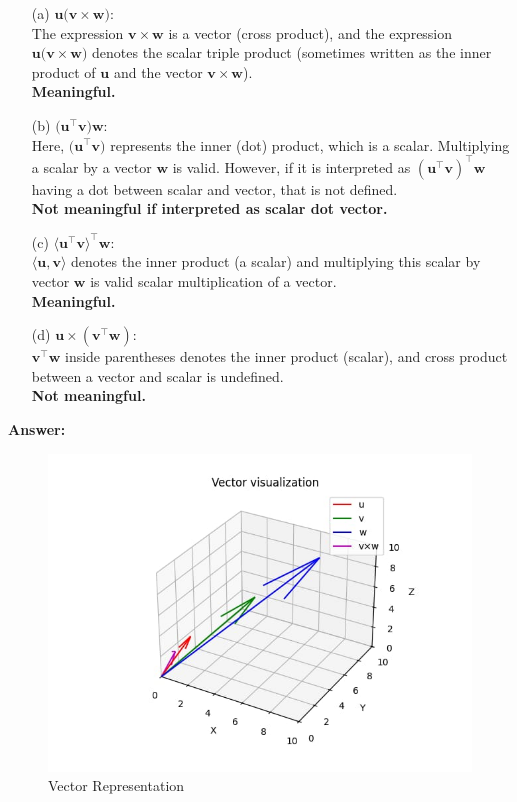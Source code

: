 \documentclass[journal]{IEEEtran}
\begin{document}
\begin{itemize}
    \item[(a)] $\mathbf{u} \big(\mathbf{v} \times \mathbf{w}\big)$: \\
    The expression $\mathbf{v} \times \mathbf{w}$ is a vector (cross product), and the expression $\mathbf{u} \big(\mathbf{v} \times \mathbf{w}\big)$ denotes the scalar triple product (sometimes written as the inner product of $\mathbf{u}$ and the vector $\mathbf{v} \times \mathbf{w}$).\\
    \textbf{Meaningful.}
    
    \item[(b)] $\big(\mathbf{u} ^\top\mathbf{v}\big) \mathbf{w}$: \\
    Here, $\big(\mathbf{u}^\top \mathbf{v}\big)$ represents the inner (dot) product, which is a scalar. Multiplying a scalar by a vector $\mathbf{w}$ is valid. However, if it is interpreted as $(\mathbf{u}^\top  \mathbf{v}) ^\top \mathbf{w}$ having a dot between scalar and vector, that is not defined.\\
    \textbf{Not meaningful if interpreted as scalar dot vector.}
    
    \item[(c)] $\langle \mathbf{u}^\top  \mathbf{v} \rangle^\top  \mathbf{w}$: \\
    $\langle \mathbf{u}, \mathbf{v} \rangle$ denotes the inner product (a scalar) and multiplying this scalar by vector $\mathbf{w}$ is valid scalar multiplication of a vector.\\
    \textbf{Meaningful.} 


    \item[(d)] $\mathbf{u} \times (\mathbf{v}^\top  \mathbf{w})$: \\
    $\mathbf{v}^\top \mathbf{w}$ inside parentheses denotes the inner product (scalar), and cross product between a vector and scalar is undefined.\\
    \textbf{Not meaningful.}
    
\end{itemize}
\textbf{Answer:}
\begin{figure}[htbp]
    \centering
    \includegraphics[width=0.65\linewidth]{FIG/fig1.png}
    \caption{Vector Representation}
    \label{fig:FIG/fig1.png}
    \end{figure}
\end{document}
